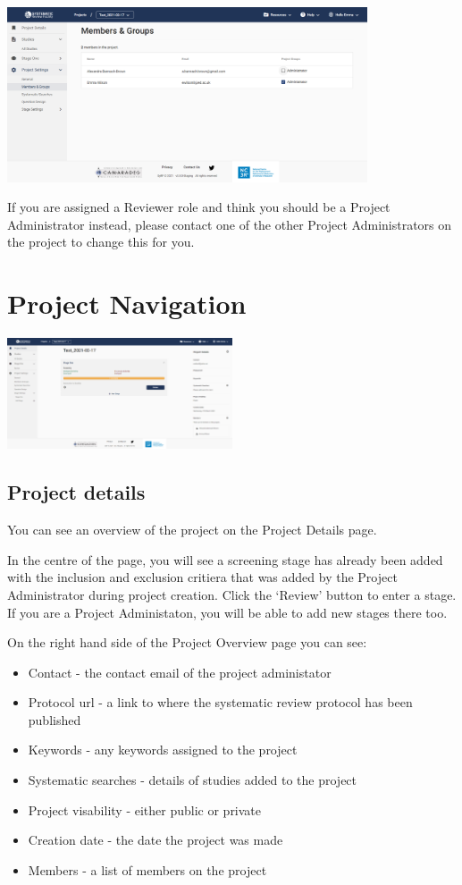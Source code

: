 \documentclass[
]{book}
\providecommand{\tightlist}{%
  \setlength{\itemsep}{0pt}\setlength{\parskip}{0pt}}
\begin{document}
\includegraphics[width=0.8\textwidth,height=0.8\textheight]{figs/05_01_change_user_role.png}

If you are assigned a Reviewer role and think you should be a Project Administrator instead, please contact one of the other Project Administrators on the project to change this for you.

\hypertarget{nagivation}{%
\chapter{Project Navigation}\label{nagivation}}

\includegraphics[width=0.5\textwidth,height=0.5\textheight]{figs/06_01_project_nav.png}

\hypertarget{project-details}{%
\section{Project details}\label{project-details}}

You can see an overview of the project on the Project Details page.

In the centre of the page, you will see a screening stage has already been added with the inclusion and exclusion critiera that was added by the Project Administrator during project creation. Click the `Review' button to enter a stage. If you are a Project Administaton, you will be able to add new stages there too.

On the right hand side of the Project Overview page you can see:

\begin{itemize}
\tightlist
\item
  Contact - the contact email of the project administator
\item
  Protocol url - a link to where the systematic review protocol has been published
\item
  Keywords - any keywords assigned to the project
\item
  Systematic searches - details of studies added to the project
\item
  Project visability - either public or private
\item
  Creation date - the date the project was made
\item
  Members - a list of members on the project
\end{itemize}
\end{document}
